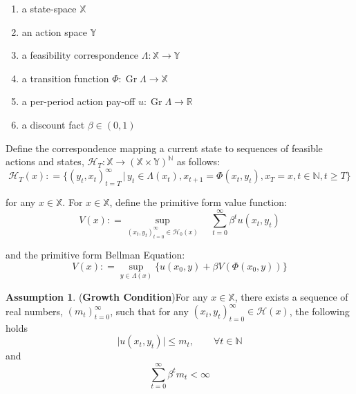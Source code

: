 \documentclass[12pt]{ectaart}
\DeclareMathOperator{\Gr}{Gr}
\newcommand{\1}{\mathbbm 1}
\theoremstyle{plain}
\theoremstyle{definition}
\newtheorem{assumption}{Assumption}[section]
\begin{document}
\begin{enumerate}
	\item  a state-space $\mathbb{X}$
	\item an action space $\mathbb{Y}$
	\item a feasibility correspondence $\Lambda\colon \mathbb{X} \rightarrow \mathbb{Y}$
	\item a transition function $\Phi \colon \Gr\Lambda \rightarrow \mathbb{X}$
	\item a per-period action pay-off $u\colon \Gr\Lambda \rightarrow \mathbb{R}$
	\item a discount fact $\beta\in (0,1)$
\end{enumerate}

Define the correspondence mapping a current state to sequences of feasible actions and states, $\mathcal{H}_{T}\colon \mathbb{X} \rightarrow (\mathbb{X}\times \mathbb{Y})^{\mathbb{N}}$ as follows:
%
\begin{equation*}
\mathcal{H}_{T}(x)\colon = \big\{(y_{t},x_{t})_{t=T}^{\infty}\,\big\vert\, y_{t}\in \Lambda(x_{t}), x_{t+1}= \Phi( x_{t},y_{t}), x_{T}=x, t\in \mathbb{N}, t \geq T\big\}
\end{equation*}
%

for any $x\in \mathbb{X}$. For $x\in \mathbb{X}$, define the primitive form value function:
%
\begin{equation}\label{eq: vfunc}
V(x) \colon = \sup_{(x_{t},y_{t})_{t=0}^{\infty}\in \mathcal{H}_{0}(x)}\quad\sum_{t=0}^{\infty}\beta^{t}u(x_{t},y_{t})
\end{equation}

and the primitive form Bellman Equation:
%
\begin{equation}\label{eq: Bellmaneq}
V(x)\colon = \sup_{y\in \Lambda(x)}\bigg\{u(x_{0},y)+\beta V(\Phi(x_{0},y))\bigg\}
\end{equation}


\begin{assumption}(\textbf{Growth Condition})\label{ass: growthcondbpo}
	For any $x\in \mathbb{X}$, there exists a sequence of real numbers, $(m_{t})_{t=0}^{\infty}$, such that for any $(x_{t},y_{t})_{t=0}^{\infty}\in\mathcal{H}(x)$, the following holds
	\begin{equation}\label{eq: vafun}
	\vert u(x_{t},y_{t})\vert \leq m_{t}, \qquad \forall t\in \mathbb{N}
	\end{equation}
	and 
	\begin{equation}\label{eq: prim_bellman}
	\sum_{t=0}^{\infty}\beta^{t}m_{t} < \infty 
	\end{equation}
\end{assumption}
\end{document}
